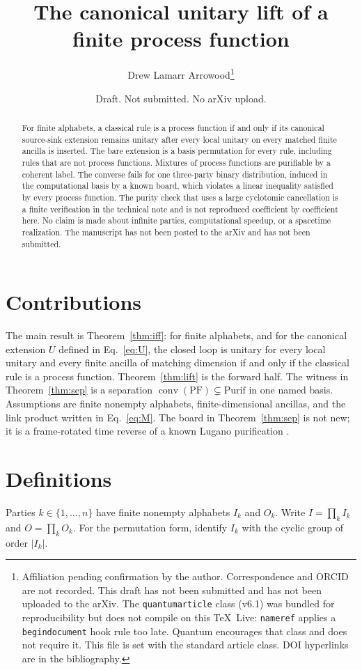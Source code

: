 \documentclass[11pt]{article}
\title{The canonical unitary lift of a finite process function}
\author{Drew Lamarr Arrowood\thanks{Affiliation pending confirmation by the author. Correspondence and ORCID are not recorded. This draft has not been submitted and has not been uploaded to the arXiv. The \texttt{quantumarticle} class (v6.1) was bundled for reproducibility but does not compile on this TeX~Live: \texttt{nameref} applies a \texttt{begindocument} hook rule too late. Quantum encourages that class and does not require it. This file is set with the standard article class. DOI hyperlinks are in the bibliography.}}
\date{Draft. Not submitted. No arXiv upload.}
\theoremstyle{definition}
\begin{document}
\maketitle

\begin{abstract}
For finite alphabets, a classical rule is a process function if and only if its canonical source-sink extension remains unitary after every local unitary on every matched finite ancilla is inserted. The bare extension is a basis permutation for every rule, including rules that are not process functions. Mixtures of process functions are purifiable by a coherent label. The converse fails for one three-party binary distribution, induced in the computational basis by a known board, which violates a linear inequality satisfied by every process function. The purity check that uses a large cyclotomic cancellation is a finite verification in the technical note and is not reproduced coefficient by coefficient here. No claim is made about infinite parties, computational speedup, or a spacetime realization. The manuscript has not been posted to the arXiv and has not been submitted.
\end{abstract}

\section{Contributions}
\label{sec:contrib}
The main result is Theorem~\ref{thm:iff}: for finite alphabets, and for the canonical extension \(U\) defined in Eq.~\eqref{eq:U}, the closed loop is unitary for every local unitary and every finite ancilla of matching dimension if and only if the classical rule is a process function. Theorem~\ref{thm:lift} is the forward half. The witness in Theorem~\ref{thm:sep} is a separation \(\operatorname{conv}(\mathrm{PF})\subsetneq\mathrm{Purif}\) in one named basis. Assumptions are finite nonempty alphabets, finite-dimensional ancillas, and the link product written in Eq.~\eqref{eq:M}. The board in Theorem~\ref{thm:sep} is not new; it is a frame-rotated time reverse of a known Lugano purification \cite{guerin2018}.

\section{Definitions}
\label{sec:def}
Parties \(k\in\{1,\ldots,n\}\) have finite nonempty alphabets \(I_k\) and \(O_k\). Write \(I=\prod_k I_k\) and \(O=\prod_k O_k\). For the permutation form, identify \(I_k\) with the cyclic group of order \(|I_k|\).
\end{document}
